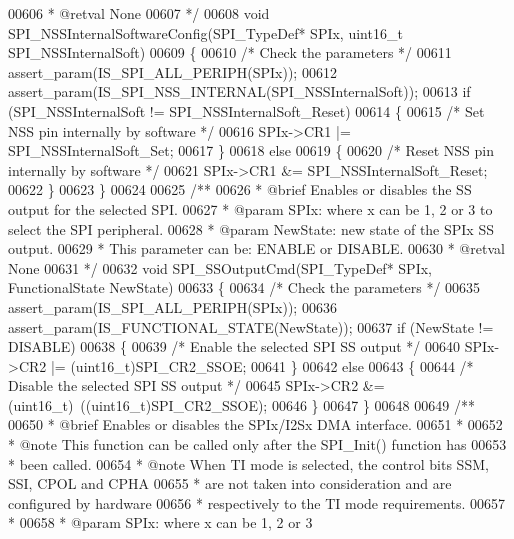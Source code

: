 \begin{DoxyCode}
00606 \textcolor{comment}{  * @retval None}
00607 \textcolor{comment}{  */}
00608 \textcolor{keywordtype}{void} SPI_NSSInternalSoftwareConfig(SPI\_TypeDef* SPIx, uint16\_t SPI\_NSSInternalSoft)
00609 \{
00610   \textcolor{comment}{/* Check the parameters */}
00611   assert_param(IS\_SPI\_ALL\_PERIPH(SPIx));
00612   assert_param(IS\_SPI\_NSS\_INTERNAL(SPI\_NSSInternalSoft));
00613   \textcolor{keywordflow}{if} (SPI\_NSSInternalSoft != SPI_NSSInternalSoft_Reset)
00614   \{
00615     \textcolor{comment}{/* Set NSS pin internally by software */}
00616     SPIx->CR1 |= SPI_NSSInternalSoft_Set;
00617   \}
00618   \textcolor{keywordflow}{else}
00619   \{
00620     \textcolor{comment}{/* Reset NSS pin internally by software */}
00621     SPIx->CR1 &= SPI_NSSInternalSoft_Reset;
00622   \}
00623 \}
00624 
00625 \textcolor{comment}{/**}
00626 \textcolor{comment}{  * @brief  Enables or disables the SS output for the selected SPI.}
00627 \textcolor{comment}{  * @param  SPIx: where x can be 1, 2 or 3 to select the SPI peripheral.}
00628 \textcolor{comment}{  * @param  NewState: new state of the SPIx SS output. }
00629 \textcolor{comment}{  *          This parameter can be: ENABLE or DISABLE.}
00630 \textcolor{comment}{  * @retval None}
00631 \textcolor{comment}{  */}
00632 \textcolor{keywordtype}{void} SPI_SSOutputCmd(SPI\_TypeDef* SPIx, FunctionalState NewState)
00633 \{
00634   \textcolor{comment}{/* Check the parameters */}
00635   assert_param(IS\_SPI\_ALL\_PERIPH(SPIx));
00636   assert_param(IS\_FUNCTIONAL\_STATE(NewState));
00637   \textcolor{keywordflow}{if} (NewState != DISABLE)
00638   \{
00639     \textcolor{comment}{/* Enable the selected SPI SS output */}
00640     SPIx->CR2 |= (uint16\_t)SPI_CR2_SSOE;
00641   \}
00642   \textcolor{keywordflow}{else}
00643   \{
00644     \textcolor{comment}{/* Disable the selected SPI SS output */}
00645     SPIx->CR2 &= (uint16\_t)~((uint16\_t)SPI_CR2_SSOE);
00646   \}
00647 \}
00648 
00649 \textcolor{comment}{/**}
00650 \textcolor{comment}{  * @brief  Enables or disables the SPIx/I2Sx DMA interface.}
00651 \textcolor{comment}{  *   }
00652 \textcolor{comment}{  * @note   This function can be called only after the SPI\_Init() function has }
00653 \textcolor{comment}{  *         been called. }
00654 \textcolor{comment}{  * @note   When TI mode is selected, the control bits SSM, SSI, CPOL and CPHA }
00655 \textcolor{comment}{  *         are not taken into consideration and are configured by hardware}
00656 \textcolor{comment}{  *         respectively to the TI mode requirements.  }
00657 \textcolor{comment}{  * }
00658 \textcolor{comment}{  * @param  SPIx: where x can be 1, 2 or 3 }

\end{DoxyCode}
